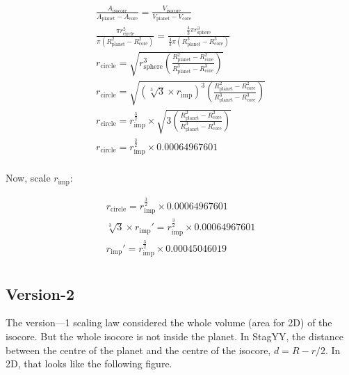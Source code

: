 \documentclass[12pt]{extarticle}
\begin{document}
\begin{align*}
   &\frac{A_{\mathrm{isocore}}}{A_{\mathrm{planet}}-A_{\mathrm{core}}} = \frac{V_{\mathrm{isocore}}}{V_{\mathrm{planet}}-V_{\mathrm{core}}} &  \\
   &\frac{\pi r_{\mathrm{circle}}^2}{\pi (R_{\mathrm{planet}}^2-R_{\mathrm{core}}^2)}  =  \frac {\frac{4}{3} \pi r_{\mathrm{sphere}}^3 } {\frac{4}{3} \pi (R_{\mathrm{planet}}^3-R_{\mathrm{core}}^3) }& \\
   &r_{\mathrm{circle}} = \sqrt{r_{\mathrm{sphere}}^3 \left(\frac{R_{\mathrm{planet}}^2 - R_{\mathrm{core}}^2}{R_{\mathrm{planet}}^3 - R_{\mathrm{core}}^3}\right)}& \\
   &r_{\mathrm{circle}} = \sqrt{\left({\sqrt[3]{3} \times r_{\mathrm{imp}}}\right)^3 \left(\frac{R_{\mathrm{planet}}^2 - R_{\mathrm{core}}^2}{R_{\mathrm{planet}}^3 - R_{\mathrm{core}}^3}\right)} & \\
   &r_{\mathrm{circle}} = r_{\mathrm{imp}}^{\frac{3}{2}} \times \sqrt{3 \left(\frac{R_{\mathrm{planet}}^2 - R_{\mathrm{core}}^2}{R_{\mathrm{planet}}^3 - R_{\mathrm{core}}^3}\right)}& \\
   &r_{\mathrm{circle}} = r_{\mathrm{imp}}^{\frac{3}{2}} \times 0.00064967601& \\
\end{align*}



Now, scale $r_{\mathrm{imp}}$:

\begin{align*}
   &r_{\mathrm{circle}} = r_{\mathrm{imp}}^{\frac{3}{2}} \times 0.00064967601& \\
   &\sqrt[3]{3} \times r_{\mathrm{imp}}' = r_{\mathrm{imp}}^{\frac{3}{2}} \times 0.00064967601& \\
   &r_{\mathrm{imp}}' = r_{\mathrm{imp}}^{\frac{3}{2}} \times 0.00045046019& \\
   &
\end{align*}

\clearpage

\subsection{Version-2}

The version---1 scaling law considered the whole volume (area for 2D) of the isocore. But the whole isocore is not inside the planet. In StagYY, the distance between the centre of the planet and the centre of the isocore, $d = R-r/2$. In 2D, that looks like the following figure.
\end{document}

